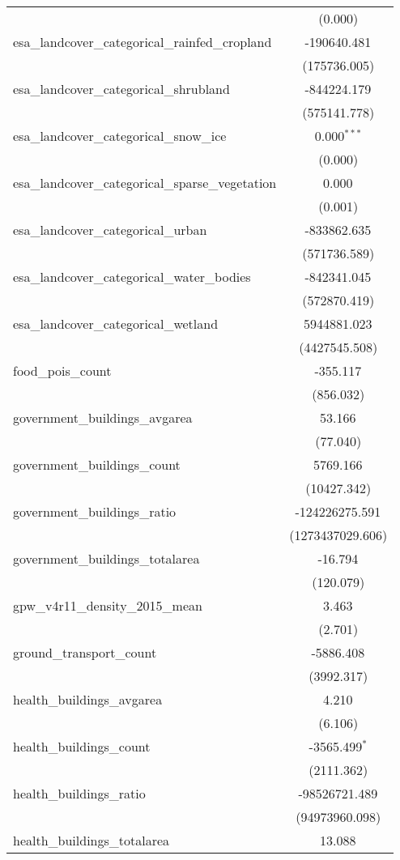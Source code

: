 \begin{table}[!htbp]
\begin{tabular}{@{\extracolsep{5pt}}lc}
  & (0.000) \\
 esa_landcover_categorical_rainfed_cropland & -190640.481$^{}$ \\
  & (175736.005) \\
 esa_landcover_categorical_shrubland & -844224.179$^{}$ \\
  & (575141.778) \\
 esa_landcover_categorical_snow_ice & 0.000$^{***}$ \\
  & (0.000) \\
 esa_landcover_categorical_sparse_vegetation & 0.000$^{}$ \\
  & (0.001) \\
 esa_landcover_categorical_urban & -833862.635$^{}$ \\
  & (571736.589) \\
 esa_landcover_categorical_water_bodies & -842341.045$^{}$ \\
  & (572870.419) \\
 esa_landcover_categorical_wetland & 5944881.023$^{}$ \\
  & (4427545.508) \\
 food_pois_count & -355.117$^{}$ \\
  & (856.032) \\
 government_buildings_avgarea & 53.166$^{}$ \\
  & (77.040) \\
 government_buildings_count & 5769.166$^{}$ \\
  & (10427.342) \\
 government_buildings_ratio & -124226275.591$^{}$ \\
  & (1273437029.606) \\
 government_buildings_totalarea & -16.794$^{}$ \\
  & (120.079) \\
 gpw_v4r11_density_2015_mean & 3.463$^{}$ \\
  & (2.701) \\
 ground_transport_count & -5886.408$^{}$ \\
  & (3992.317) \\
 health_buildings_avgarea & 4.210$^{}$ \\
  & (6.106) \\
 health_buildings_count & -3565.499$^{*}$ \\
  & (2111.362) \\
 health_buildings_ratio & -98526721.489$^{}$ \\
  & (94973960.098) \\
 health_buildings_totalarea & 13.088$^{}$ \\

\end{tabular}
\end{table}
